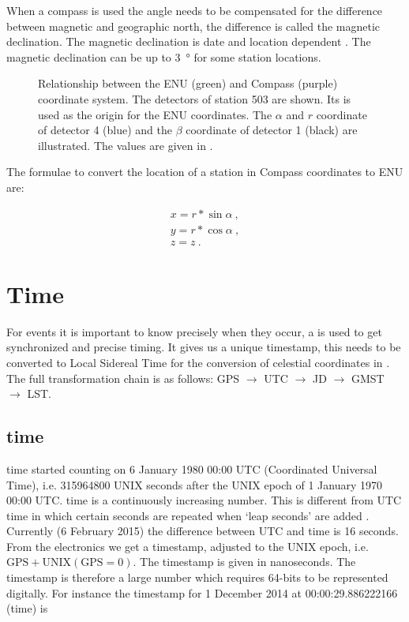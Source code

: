 When a compass is used the angle needs to be compensated for the
difference between magnetic and geographic north, the difference is
called the magnetic declination. The magnetic declination is date and
location dependent \cite{canada:2013aa}. The magnetic declination can be
up to \SI{3}{\degree} for some \hisparc station locations.

\begin{figure}
    \centering
    
    \caption{Relationship between the ENU (green) and Compass (purple)
             coordinate system. The detectors of station 503 are shown.
             Its \gps is used as the origin for the ENU coordinates. The
             $\alpha$ and $r$ coordinate of detector 4 (blue) and the
             $\beta$ coordinate of detector 1 (black) are illustrated.
             The values are given in .}
    \label{fig:enu_compass}
\end{figure}

The formulae to convert the location of a station in Compass coordinates
to ENU are:

\begin{equation}
    \begin{array}{l}
        x = r * \sin{\alpha} \ , \\
        y = r * \cos{\alpha} \ , \\
        z = z \ .
    \end{array}
\end{equation}


\section{Time}
\label{sec:time}

For \hisparc events it is important to know precisely when they occur, a
\gps is used to get synchronized and precise timing. It gives us a
unique timestamp, this needs to be converted to Local Sidereal Time for
the conversion of celestial coordinates in . The
full transformation chain is as follows: GPS $\to$ UTC $\to$ JD $\to$
GMST $\to$ LST.


\subsection{\gps time}

\gps time started counting on 6 January 1980 00:00 UTC (Coordinated
Universal Time), i.e. \num{315964800} UNIX seconds after the UNIX epoch
of 1 January 1970 00:00 UTC. \gps time is a continuously increasing
number. This is different from UTC time in which certain seconds are
repeated when `leap seconds' are added \cite{usno:2012aa}. Currently (6
February 2015) the difference between UTC and \gps time is 16 seconds.
From the \hisparc electronics we get a \gps timestamp, adjusted to the
UNIX epoch, i.e. $\mathrm{GPS} + \mathrm{UNIX(GPS=0)}$. The timestamp is
given in nanoseconds. The \gps timestamp is therefore a large number
which requires 64-bits to be represented digitally. For instance the
\gps timestamp for 1 December 2014 at 00:00:29.886222166 (\gps time) is

